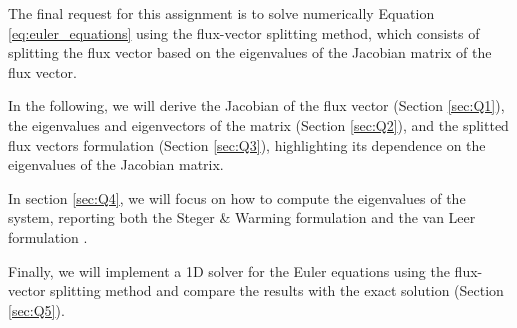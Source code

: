 The final request for this assignment is to solve numerically Equation \ref{eq:euler_equations} using the flux-vector splitting method, which consists of splitting the flux vector based on the eigenvalues of the Jacobian matrix of the flux vector.

In the following, we will derive the Jacobian of the flux vector (Section \ref{sec:Q1}), the eigenvalues and eigenvectors of the matrix (Section \ref{sec:Q2}), and the splitted flux vectors formulation (Section \ref{sec:Q3}), highlighting its dependence on the eigenvalues of the Jacobian matrix.

In section \ref{sec:Q4}, we will focus on how to compute the eigenvalues of the system, reporting both the Steger \& Warming formulation \cite{Steger-Warming} and the van Leer formulation \cite{van-Leer}.

Finally, we will implement a 1D solver for the Euler equations using the flux-vector splitting method and compare the results with the exact solution (Section \ref{sec:Q5}).
